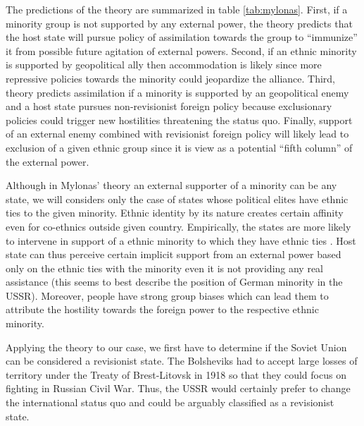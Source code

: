 The predictions of the theory are summarized in table \ref{tab:mylonas}. First, if a minority group is not supported by any external power, the theory predicts that the host state will pursue policy of assimilation towards the group to \enquote{immunize} it from possible future  agitation  of external powers. Second, if an ethnic minority is supported by geopolitical ally then accommodation is likely since more repressive policies towards the minority could jeopardize the alliance. Third, theory predicts assimilation if a minority is supported by an geopolitical enemy and a host state pursues non-revisionist foreign policy because exclusionary policies could trigger new hostilities threatening the status quo. 
Finally, support of an external enemy combined with revisionist foreign policy will likely lead to exclusion of a given ethnic group since it is view as a potential \enquote{fifth column} of the external power. 




Although in Mylonas' theory an  external supporter of a minority can be any state, 
we will considers only the  case of states whose political elites have ethnic ties to the given minority.  
Ethnic identity by its nature creates certain affinity even for co-ethnics outside given country. Empirically, the states are more likely to intervene in support of a 
ethnic minority to which they have ethnic ties \citep{davis_ethnicity_1997, saideman_ties_2001, saideman_discrimination_2002}. 
Host state can thus perceive certain implicit support from an external power based only on  the ethnic ties with the minority even it is not providing any real assistance (this seems to best describe the position of German minority in the USSR). 
Moreover, people have strong group biases which can lead them to
attribute the hostility towards the foreign power to the respective ethnic minority. 

Applying the theory to our case, we first have to determine if the Soviet Union can be considered a revisionist state. The Bolsheviks had to accept large losses of territory under the Treaty of Brest-Litovsk in 1918 so that they could focus on fighting in Russian Civil War. Thus, the USSR would certainly prefer to change the international status quo and could be arguably classified as a revisionist state.

